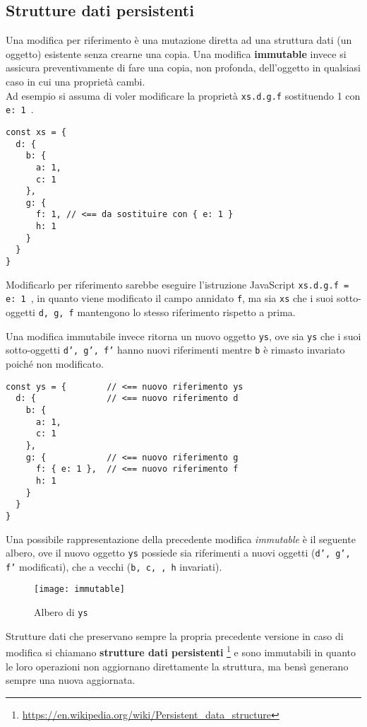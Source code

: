 \subsection{Strutture dati persistenti}

Una modifica per riferimento è una mutazione diretta ad una struttura dati (un oggetto) esistente senza crearne una copia. Una modifica \textbf{immutable} invece si assicura preventivamente di fare una copia, non profonda, dell'oggetto in qualsiasi caso in cui una proprietà cambi. \\

Ad esempio si assuma di voler modificare la proprietà \texttt{xs.d.g.f} sostituendo 1 con \texttt{{ e: 1 }}. 

\begin{lstlisting}
const xs = {
  d: {
    b: {
      a: 1,
      c: 1
    },
    g: {
      f: 1, // <== da sostituire con { e: 1 }
      h: 1
    }
  }
}
\end{lstlisting}

Modificarlo per riferimento sarebbe eseguire l'istruzione JavaScript \texttt{xs.d.g.f = { e: 1 }}, in quanto viene modificato il campo annidato \texttt{f}, ma sia \texttt{xs} che i suoi sotto-oggetti \texttt{d, g, f} mantengono lo stesso riferimento rispetto a prima.

Una modifica immutabile invece ritorna un nuovo oggetto \texttt{ys}, ove sia \texttt{ys} che i suoi sotto-oggetti \texttt{d', g', f'} hanno nuovi riferimenti mentre \texttt{b} è rimasto invariato poiché non modificato.

\begin{lstlisting}
const ys = {        // <== nuovo riferimento ys
  d: {              // <== nuovo riferimento d
    b: {
      a: 1,
      c: 1
    },
    g: {            // <== nuovo riferimento g
      f: { e: 1 },  // <== nuovo riferimento f
      h: 1
    }
  }
}
\end{lstlisting}

Una possibile rappresentazione della precedente modifica \textit{immutable} è il seguente albero, ove il nuovo oggetto \texttt{ys} possiede sia riferimenti a nuovi oggetti (\texttt{d', g', f'} modificati), che a vecchi (\texttt{b, c, , h} invariati).

\begin{figure}[H] 
  \centering 
  \texttt{[image: immutable]} 
  \caption{Albero di \texttt{ys}}
\end{figure}

Strutture dati che preservano sempre la propria precedente versione in caso di modifica si chiamano \textbf{strutture dati persistenti} \footnote{\url{https://en.wikipedia.org/wiki/Persistent_data_structure}} e sono immutabili in quanto le loro operazioni non aggiornano direttamente la struttura, ma bensì generano sempre una nuova aggiornata. 

